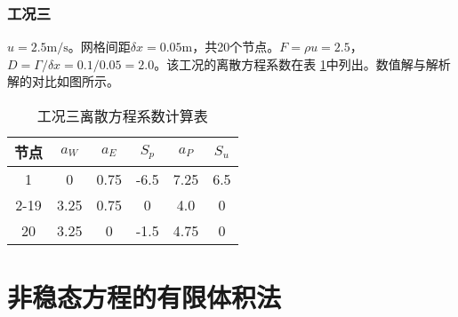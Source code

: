 \subsubsection{工况三}
$u=2.5\mathrm{m/s}$。网格间距$\delta x=0.05\mathrm{m}$，共20个节点。$F=\rho
u=2.5$，$D=\Gamma/\delta x=0.1/0.05=2.0$。该工况的离散方程系数在表
\ref{TbFV_cd_cd_coeff_value3}中列出。数值解与解析解的对比如图所示。
\begin{table}[H]
  \begin{center}
  \caption{工况三离散方程系数计算表}
  \label{TbFV_cd_cd_coeff_value3}
  \begin{tabular}{|c|c|c|c|c|c|}
    \hline
    节点 & $a_{W}$ & $a_{E}$ & $S_{p}$ & $a_{P}$ & $S_{u}$ \\
    \hline
    1 & 0 & 0.75 & -6.5 &   7.25   &  6.5\\
    \hline
    2-19 & 3.25 & 0.75 & 0 & 4.0 & 0 \\
    \hline
    20 & 3.25 & 0 & -1.5 & 4.75 &  0 \\
    \hline
  \end{tabular}
  \end{center}
\end{table}
\section{非稳态方程的有限体积法}

